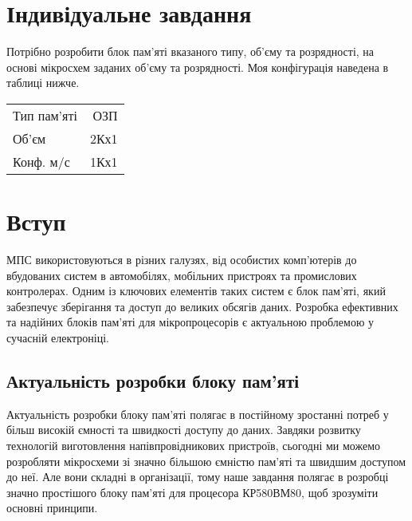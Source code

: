 \documentclass[a4paper, 12pt, oneside]{extreport}
\begin{document}


\chapter*{Індивідуальне завдання}

Потрібно розробити блок пам'яті вказаного типу, об'єму та розрядності,
на основі мікросхем заданих об'єму та розрядності. Моя конфігурація
наведена в таблиці нижче.

\begin{table}[h]
\begin{tabular}{lr}
	Тип пам’яті & ОЗП \\
	Об’єм & 2Кх1   \\
	Конф. м/с & 1Кх1 \\
\end{tabular}
\end{table}

\printnomenclature

\tableofcontents

\chapter*{Вступ}


МПС використовуються в різних галузях, від особистих комп'ютерів до вбудованих
систем в автомобілях, мобільних пристроях та промислових контролерах. Одним із
ключових елементів таких систем є блок пам'яті, який забезпечує зберігання та
доступ до великих обсягів даних. Розробка ефективних та надійних блоків пам'яті
для мікропроцесорів є актуальною проблемою у сучасній електроніці.

\section*{Актуальність розробки блоку пам'яті}

Актуальність розробки блоку пам'яті полягає в постійному зростанні потреб у
більш високій ємності та швидкості доступу до даних. Завдяки розвитку
технологій виготовлення напівпровідникових пристроїв, сьогодні ми можемо
розробляти мікросхеми зі значно більшою ємністю пам'яті та швидшим доступом до
неї. Але вони складні в організації, тому наше завдання полягає в розробці значно
простішого блоку пам'яті для процесора КР580ВМ80, щоб зрозуміти основні принципи.
\end{document}
